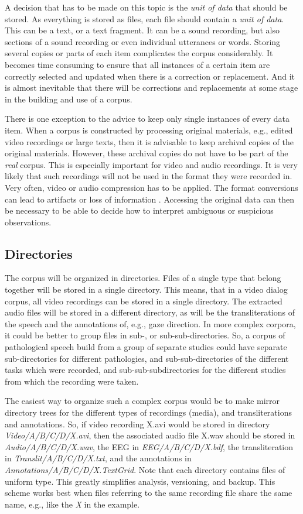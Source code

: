 \documentclass[10pt, a4paper]{article}
\begin{document}
A decision that has to be made on this topic is the \emph{unit of data} that should be stored. As everything is stored as files, each file should contain a  \emph{unit of data}. This can be a text, or a text fragment. It can be a sound recording, but also sections of a sound recording or even individual utterances or words. Storing several copies or parts of each item complicates the corpus considerably. It becomes time consuming to ensure that all instances of a certain item are correctly selected and updated when there is a correction or replacement. And it is almost inevitable that there will be corrections and replacements at some stage in the building and use of a corpus. 

There is one exception to the advice to keep only single instances of every data item. When a corpus is constructed by processing original materials, e.g., edited video recordings or large texts, then it is advisable to keep archival copies of the original materials. However, these archival copies do not have to be part of the \emph{real} corpus. This is especially important for video and audio recordings. It is very likely that such recordings will not be used in the format they were recorded in. Very often, video or audio compression has to be applied. The format conversions can lead to artifacts or loss of information \cite{van2005study}. Accessing the original data can then be necessary to be able to decide how to interpret ambiguous or suspicious observations.

\subsection{Directories}

The corpus will be organized in directories. Files of a single type that belong together will be stored in a single directory. This means, that in a video dialog corpus, all video recordings can be stored in a single directory. The extracted audio files will be stored in a different directory, as will be the transliterations of the speech and the annotations of, e.g., gaze direction. In more complex corpora, it could be better to group files in sub-, or sub-sub-directories. So, a corpus of pathological speech build from a group of separate studies could have separate sub-directories for different pathologies, and sub-sub-directories of the different tasks which were recorded, and sub-sub-subdirectories for the different studies from which the recording were taken.

The easiest way to organize such a complex corpus would be to make mirror directory trees for the different types of recordings (media), and transliterations and annotations. So, if video recording X.avi would be stored in directory \emph{Video/A/B/C/D/X.avi}, then the associated audio file X.wav should be stored in \emph{Audio/A/B/C/D/X.wav}, the EEG in \emph{EEG/A/B/C/D/X.bdf}, the transliteration in \emph{Translit/A/B/C/D/X.txt}, and the annotations in \emph{Annotations/A/B/C/D/X.TextGrid}. Note that each directory contains files of uniform type. This greatly simplifies analysis, versioning, and backup. This scheme works best when files referring to the same recording file share the same name, e.g., like the \emph{X} in the example.
\end{document}
